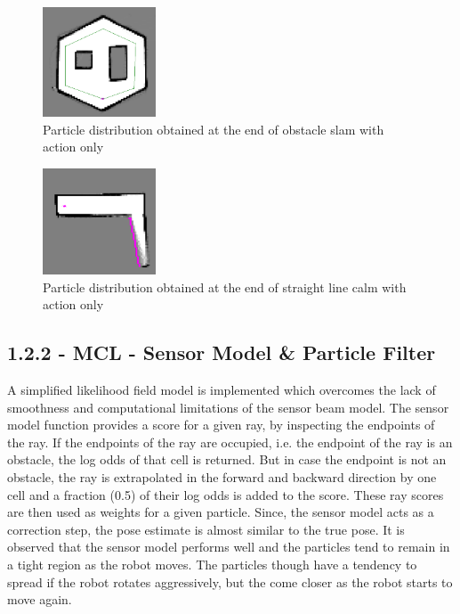\documentclass[journal,twocolumn]{IEEEtran}
\begin{document}
\begin{figure}[H]
\centering
\includegraphics[width=0.3\textwidth]{Media/1212.png}
\caption{Particle distribution obtained at the end of obstacle slam with action only}
\end{figure}

\begin{figure}[H]
\centering
\includegraphics[width=0.3\textwidth]{Media/1213.png}
\caption{Particle distribution obtained at the end of straight line calm with action only}
\end{figure}

\subsection*{1.2.2 - MCL - Sensor Model \& Particle Filter} 

A simplified likelihood field model is implemented which overcomes the lack of smoothness and computational limitations of the sensor beam model. The sensor model function provides a score for a given ray, by inspecting the endpoints of the ray. If the endpoints of the ray are occupied, i.e. the endpoint of the ray is an obstacle, the log odds of that cell is returned. But in case the endpoint is not an obstacle, the ray is extrapolated in the forward and backward direction by one cell and a fraction (0.5) of their log odds is added to the score. These ray scores are then used as weights for a given particle. Since, the sensor model acts as a correction step, the pose estimate is almost similar to the true pose. It is observed that the sensor model performs well and the particles tend to remain in a tight region as the robot moves. The particles though have a tendency to spread if the robot rotates aggressively, but the come closer as the robot starts to move again.
\end{document}
